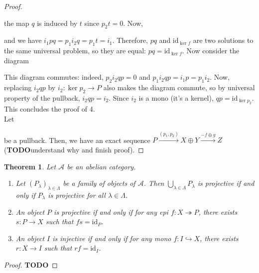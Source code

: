 \documentclass{article}
\newcommand{\id}{\mathrm{id}}
\newcommand{\Acat}{\mathcal{A}}
\newcommand{\todo}{\textbf{TODO}}
\theoremstyle{plain}
\newtheorem{theorem}{Theorem}[section]
\theoremstyle{definition}
\theoremstyle{remark}
\begin{document}
\begin{proof}
\begin{center}
    \end{center}
    the map $q$ is induced by $t$ since $p_2 t = 0$. Now,
    \begin{center}
    \end{center}
    and we have $i_1 pq = p_1 i_2 q = p_1 t = i_1$. Therefore, $pq$ and $\id_{\ker f}$ are two solutions to the same universal problem, so they are equal: $pq = \id_{\ker f}$. Now consider the diagram
    \begin{center}
    \end{center}
    This diagram commutes: indeed, $p_2 i_2 qp = 0$ and $p_1 i_2 qp = i_1 p = p_1 i_2$. Now, replacing $i_2 qp$ by $i_2 : \ker p_2 \to P$ also makes the diagram commute, so by universal property of the pullback, $i_2 qp = i_2$. Since $i_2$ is a mono (it's a kernel), $qp = \id_{\ker p_2}$. This concludes the proof of 4. \\
    Let 
    \begin{center}
    \end{center}
    be a pullback. Then, we have an exact sequence $P \xrightarrow{(p_1, p_2)} X \oplus Y \xrightarrow{-f \oplus g} Z$ (\todo understand why and finish proof).
\end{proof}

\begin{theorem}
    Let $\Acat$ be an abelian category.
    \begin{enumerate}
        \item Let $(P_\lambda)_{\lambda \in \Lambda}$ be a family of objects of $\Acat$. Then $\bigcup_{\lambda \in \Lambda} P_\lambda$ is projective if and only if $P_\lambda$ is projective for all $\lambda \in \Lambda$.
        \item An object $P$ is projective if and only if for any epi $f : X \twoheadrightarrow P$, there exists $s : P \to X$ such that $fs = \id_P$.
        \item An object $I$ is injective if and only if for any mono $f : I \hookrightarrow X$, there exists $r : X \to I$ such that $rf = \id_I$.
    \end{enumerate}
\end{theorem}

\begin{proof}
    \todo
\end{proof}
\end{document}
